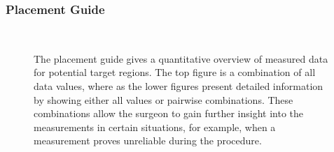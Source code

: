 \documentclass[review]{vgtc}                 %
\begin{document}
\subsubsection{Placement Guide}\label{sec:overview:placement:guide}
\begin{figure}[t]
  \centering
  \\
  \caption{The placement guide gives a quantitative overview of measured data for potential target regions. The top figure is a combination of all data values, where as the lower figures present detailed information by showing either all values or pairwise combinations. These combinations allow the surgeon to gain further insight into the measurements in certain situations, for example, when a measurement proves unreliable during the procedure.}
  \label{fig:placementguide}
\end{figure}
\end{document}
